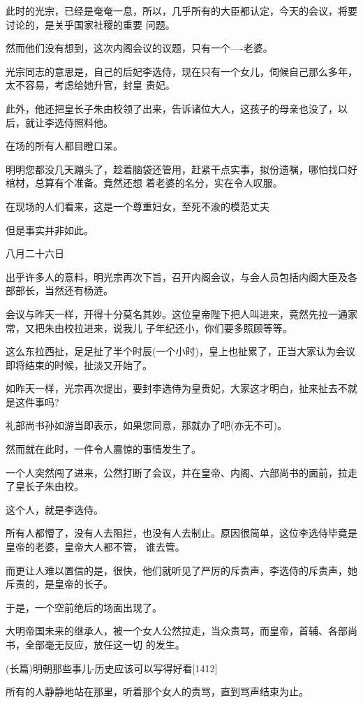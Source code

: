 \documentclass[11pt,a4paper,onecolumn]{article}
\begin{document}
此时的光宗，已经是奄奄一息，所以，几乎所有的大臣都认定，今天的会议，将要讨论的，是关乎国家社稷的重要
问题。

然而他们没有想到，这次内阁会议的议题，只有一个----老婆。

光宗同志的意思是，自己的后妃李选侍，现在只有一个女儿，伺候自己那么多年，太不容易，考虑给她升官，封皇
贵妃。

此外，他还把皇长子朱由校领了出来，告诉诸位大人，这孩子的母亲也没了，以后，就让李选侍照料他。

在场的所有人都目瞪口呆。

明明您都没几天蹦头了，趁着脑袋还管用，赶紧干点实事，拟份遗嘱，哪怕找口好棺材，总算有个准备。竟然还想
着老婆的名分，实在令人叹服。

在现场的人们看来，这是一个尊重妇女，至死不渝的模范丈夫

但是事实并非如此。

八月二十六日

出乎许多人的意料，明光宗再次下旨，召开内阁会议，与会人员包括内阁大臣及各部部长，当然还有杨涟。

会议与昨天一样，开得十分莫名其妙。这位皇帝陛下把人叫进来，竟然先拉一通家常，又把朱由校拉进来，说我儿
子年纪还小，你们要多照顾等等。

这么东拉西扯，足足扯了半个时辰(一个小时)，皇上也扯累了，正当大家认为会议即将结束的时候，扯淡又开始了。

如昨天一样，光宗再次提出，要封李选侍为皇贵妃，大家这才明白，扯来扯去不就是这件事吗?

礼部尚书孙如游当即表示，如果您同意，那就办了吧(亦无不可)。

然而就在此时，一件令人震惊的事情发生了。

一个人突然闯了进来，公然打断了会议，并在皇帝、内阁、六部尚书的面前，拉走了皇长子朱由校。

这个人，就是李选侍。

所有人都懵了，没有人去阻拦，也没有人去制止。原因很简单，这位李选侍毕竟是皇帝的老婆，皇帝大人都不管，
谁去管。

而更让人难以置信的是，很快，他们就听见了严厉的斥责声，李选侍的斥责声，她斥责的，是皇帝的长子。

于是，一个空前绝后的场面出现了。

大明帝国未来的继承人，被一个女人公然拉走，当众责骂，而皇帝，首辅、各部尚书，全部毫无反应，放任这一切
的发生。

(长篇)明朝那些事儿-历史应该可以写得好看$[$1412$]$

所有的人静静地站在那里，听着那个女人的责骂，直到骂声结束为止。
\end{document}
